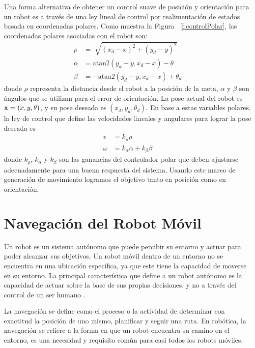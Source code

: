 Una forma alternativa de obtener un control suave de posici\'on y orientaci\'on 
para un robot es a trav\'es de una ley lineal de control por realimentaci\'on 
de estados basada en coordenadas polares. Como muestra la Figura ~\ref{f:controlPolar}, 
las coordenadas polares asociadas con el robot son:
\begin{align*}
\rho &= \sqrt[]{(x_{d} - x)^2 + (y_{d} - y)^2} \\
\alpha &= \text{atan2}(y_{d} - y, x_{d} - x) - \theta \\
\beta &= -\text{atan2}(y_{d} - y, x_{d} - x) + \theta_{d}
\end{align*}
donde $\rho$ representa la distancia desde el robot a la posici\'on de la 
meta, $\alpha$ y $\beta$ son \'angulos que se utilizan para el error de 
orientaci\'on. La pose actual del robot es $\mathbf x=(x,y,\theta)$, y su pose 
deseada es $(x_{d},y_{d},\theta_{d})$. En base a estas variables polares, la 
ley de control que define las velocidades lineales y angulares para lograr 
la pose deseada es 
\begin{align}
\label{eqn:v}
v &= k_{\rho}\rho \\
\label{eqn:w}
\omega &= k_{\alpha}\alpha + k_{\beta}\beta
\end{align}
donde $k_{\rho}$, $k_{\alpha}$ y $k_{\beta}$ son las ganancias del controlador 
polar que deben ajustarse adecuadamente para una buena respuesta del sistema. Usando 
este marco de generaci\'on de movimiento logramos el objetivo tanto en posici\'on 
como en orientaci\'on.

\section{Navegaci\'on del Robot M\'ovil}

Un robot es un sistema aut\'onomo que puede percibir su entorno y actuar para poder
alcanzar sus objetivos. Un robot m\'ovil dentro de un entorno no se encuentra en una 
ubicaci\'on espec\'ifica, ya que este tiene la capacidad de moverse en su entorno. La 
principal caracter\'istica que define a un robot aut\'onomo es la capacidad de actuar 
sobre la base de sus propias decisiones, y no a trav\'es del control de un ser 
humano \cite{mataric2007robotics}.

La navegaci\'on se define como el proceso o la actividad de determinar con exactitud 
la posici\'on de uno mismo, planificar y seguir una ruta. En rob\'otica, la navegaci\'on 
se refiere a la forma en que un robot encuentra su camino en el entorno, es una necesidad 
y requisito com\'un para casi todos los robots m\'oviles. %

